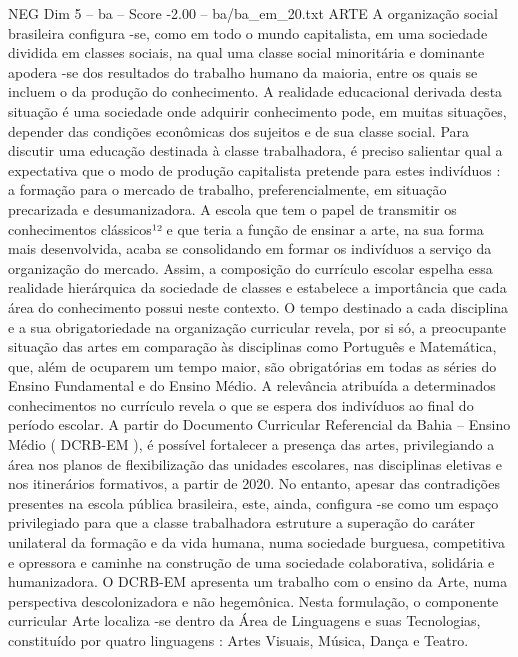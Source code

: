 \begin{textsample}{NEG Dim 5 – ba – Score -2.00 – ba/ba\_em\_20.txt}  \label{ex:f5_neg_017}
ARTE A organização social brasileira configura -se, como em todo o mundo capitalista, em uma sociedade dividida em classes sociais, na qual uma classe social minoritária e dominante apodera -se dos resultados do trabalho humano da maioria, entre os quais se incluem o da produção do conhecimento.
A realidade educacional derivada desta situação é uma sociedade onde adquirir conhecimento pode, em muitas situações, depender das condições econômicas dos sujeitos e de sua classe social.
Para discutir uma educação destinada à classe trabalhadora, é preciso salientar qual a expectativa que o modo de produção capitalista pretende para estes indivíduos : a formação para o mercado de trabalho, preferencialmente, em situação precarizada e desumanizadora.
A escola que tem o papel de transmitir os conhecimentos clássicos¹² e que teria a função de ensinar a arte, na sua forma mais desenvolvida, acaba se consolidando em formar os indivíduos a serviço da organização do mercado.
Assim, a composição do currículo escolar espelha essa realidade hierárquica da sociedade de classes e estabelece a importância que cada área do conhecimento possui neste contexto.
O tempo destinado a cada disciplina e a sua obrigatoriedade na organização curricular revela, por si só, a preocupante situação das artes em comparação às disciplinas como Português e Matemática, que, além de ocuparem um tempo maior, são obrigatórias em todas as séries do Ensino Fundamental e do Ensino Médio.
A relevância atribuída a determinados conhecimentos no currículo revela o que se espera dos indivíduos ao final do período escolar.
A partir do Documento Curricular Referencial da Bahia – Ensino Médio ( DCRB-EM ), é possível fortalecer a presença das artes, privilegiando a área nos planos de flexibilização das unidades escolares, nas disciplinas eletivas e nos itinerários formativos, a partir de 2020.
No entanto, apesar das contradições presentes na escola pública brasileira, este, ainda, configura -se como um espaço privilegiado para que a classe trabalhadora estruture a superação do caráter unilateral da formação e da vida humana, numa sociedade burguesa, competitiva e opressora e caminhe na construção de uma sociedade colaborativa, solidária e humanizadora.
O DCRB-EM apresenta um trabalho com o ensino da Arte, numa perspectiva descolonizadora e não hegemônica.
Nesta formulação, o componente curricular Arte localiza -se dentro da Área de Linguagens e suas Tecnologias, constituído por quatro linguagens : Artes Visuais, Música, Dança e Teatro.

\end{textsample}
